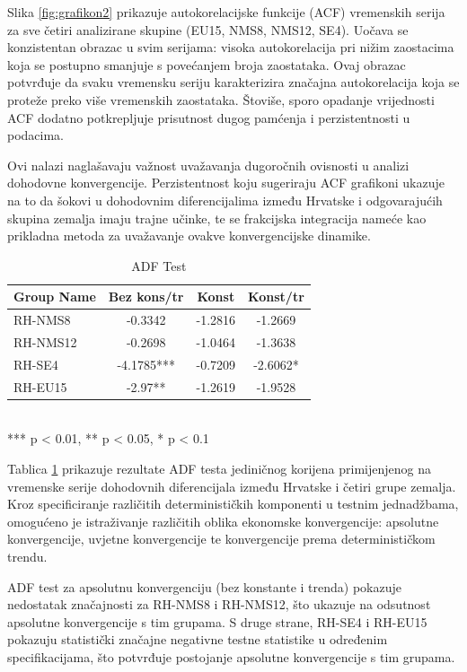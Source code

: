 \documentclass{crebsshr}
\begin{document}
Slika \ref{fig:grafikon2} prikazuje autokorelacijske funkcije (ACF) vremenskih serija za sve četiri analizirane skupine (EU15, NMS8, NMS12, SE4). Uočava se konzistentan obrazac u svim serijama: visoka autokorelacija pri nižim zaostacima koja se postupno smanjuje s povećanjem broja zaostataka. Ovaj obrazac potvrđuje da svaku vremensku seriju karakterizira značajna autokorelacija koja se proteže preko više vremenskih zaostataka. Štoviše, sporo opadanje vrijednosti ACF dodatno potkrepljuje prisutnost dugog pamćenja i perzistentnosti u podacima.

Ovi nalazi naglašavaju važnost uvažavanja dugoročnih ovisnosti u analizi dohodovne konvergencije. Perzistentnost koju sugeriraju ACF grafikoni ukazuje na to da šokovi u dohodovnim diferencijalima između Hrvatske i odgovarajućih skupina zemalja imaju trajne učinke, te se frakcijska integracija nameće kao prikladna metoda za uvažavanje ovakve konvergencijske dinamike.

\begin{table}[ht]
\centering
\caption{ADF Test}
\label{tab:tablica2}
\begin{tabular}{lccc}
\toprule
\textbf{Group Name} & \textbf{Bez kons/tr} & \textbf{Konst} & \textbf{Konst/tr} \\
\midrule
RH-NMS8  & -0.3342 & -1.2816 & -1.2669 \\
RH-NMS12 & -0.2698 & -1.0464 & -1.3638 \\
RH-SE4   & -4.1785*** & -0.7209 & -2.6062* \\
RH-EU15  & -2.97** & -1.2619 & -1.9528 \\
\bottomrule
\end{tabular}
\\
\footnotesize{*** p < 0.01, ** p < 0.05, * p < 0.1}
\end{table}

Tablica \ref{tab:tablica2} prikazuje rezultate ADF testa jediničnog korijena primijenjenog na vremenske serije dohodovnih diferencijala između Hrvatske i četiri grupe zemalja. Kroz specificiranje različitih determinističkih komponenti u testnim jednadžbama, omogućeno je istraživanje različitih oblika ekonomske konvergencije: apsolutne konvergencije, uvjetne konvergencije te konvergencije prema determinističkom trendu.
    
ADF test za apsolutnu konvergenciju (bez konstante i trenda) pokazuje nedostatak značajnosti za RH-NMS8 i RH-NMS12, što ukazuje na odsutnost apsolutne konvergencije s tim grupama. S druge strane, RH-SE4 i RH-EU15 pokazuju statistički značajne negativne testne statistike u određenim specifikacijama, što potvrđuje postojanje apsolutne konvergencije s tim grupama.
\end{document}
